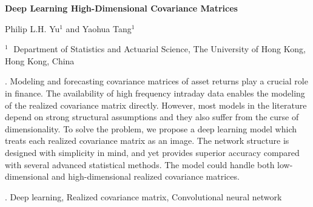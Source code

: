 \documentclass[12pt]{article}
\begin{document}
\begin{flushleft}


{\LARGE\bf Deep Learning High-Dimensional Covariance Matrices}


\vspace{1.0cm}

Philip L.H. Yu$^1$ and Yaohua Tang$^1$

\begin{description}

\item $^1 \;$ Department of Statistics and Actuarial Science, The University of Hong Kong,
Hong Kong, China


\end{description}

\end{flushleft}


\vspace{0.75cm}

. Modeling and forecasting covariance matrices of asset returns play a crucial role in finance. The availability of high frequency intraday data enables the modeling of the realized covariance matrix directly. However, most models in the literature depend on strong structural assumptions and they also suffer from the curse of dimensionality. To solve the problem, we propose a deep learning model which treats each realized covariance matrix as an image. The network structure is designed with simplicity in mind, and yet provides superior accuracy compared with several advanced statistical methods. The model could handle both low-dimensional and high-dimensional realized covariance matrices.

\vskip 2mm

.
Deep learning, Realized covariance matrix, Convolutional neural network
\end{document}
